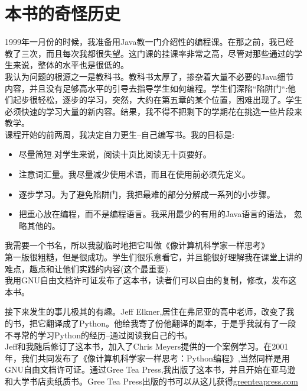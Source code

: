 \documentclass[10pt]{book}
\begin{document}
\section{本书的奇怪历史}

1999年一月份的时候，我准备用Java教一门介绍性的编程课。在那之前，我已经
教了三次，而且每次我都很失望。这门课的挂课率非常之高，尽管对那些通过的学
生来说，整体的水平也是很低的。\\

我认为问题的根源之一是教科书。教科书太厚了，掺杂着大量不必要的Java细节
内容，并且没有足够高水平的引导去指导学生如何编程。学生们深陷“陷阱门“:他们起步很轻松，逐步的学习，突然，大约在第五章的某个位置，困难出现了。学生必须快速的学习大量的新内容。结果，我不得不把剩下的学期花在挑选一些片段来教学。\\

课程开始的前两周，我决定自力更生--自己编写书。我的目标是:
\begin{itemize}

\item 尽量简短.对学生来说，阅读十页比阅读无十页要好。

\item 注意词汇量。我尽量减少使用术语，而且在使用前必须先定义。

\item 逐步学习。为了避免陷阱门，我把最难的部分分解成一系列的小步骤。

\item 把重心放在编程，而不是编程语言。我采用最少的有用的Java语言的语法，
忽略其他的。
\end{itemize}

我需要一个书名，所以我就临时地把它叫做《像计算机科学家一样思考》\\

第一版很粗糙，但是很成功。学生们很乐意看它，并且能很好理解我在课堂上讲的难点，趣点和让他们实践的内容(这个最重要).\\

我用GNU自由文档许可证发布了这本书，读者们可以自由的复制，修改，发布这本书。 \\


 接下来发生的事儿极其的有趣。Jeff Elkner,居住在弗尼亚的高中老师，改变了我的书，把它翻译成了Python。他给我寄了份他翻译的副本，于是乎我就有了一段不寻常的学习Python的经历--通过阅读我自己的书。\\

 Jeff和我随后修订了这本书，加入了Chris Meyers提供的一个案例学习。在2001年，我们共同发布了《像计算机科学家一样思考：Python编程》,当然同样是用GNU自由文档许可证。通过Gree Tea Press,我出版了这本书，并且开始在亚马逊和大学书店卖纸质书。Gree Tea Press出版的书可以从这儿获得\url{greenteapress.com}\\
\end{document}
